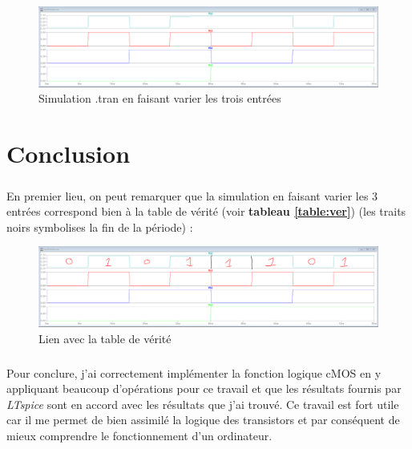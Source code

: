         \begin{figure}[H]
            \centering
            \includegraphics[scale=0.35]{../pictures/tran3.png}
            \caption{Simulation .tran en faisant varier les trois entrées}
        \end{figure}
        
\section{Conclusion}

    \subparagraph{}En premier lieu, on peut remarquer que la simulation en faisant varier les 3 entrées correspond bien à la table de vérité (voir \textbf{tableau \ref{table:ver}}) (les traits noirs symbolises la fin de la période) :
        
        \begin{figure}[H]
            \centering
            \includegraphics[scale=0.35]{../pictures/vérité.png}
            \caption{Lien avec la table de vérité}
        \end{figure}
        
    \subparagraph{}Pour conclure, j'ai correctement implémenter la fonction logique cMOS en y appliquant 
    beaucoup d'opérations pour ce travail et que les résultats fournis par \textit{LTspice} sont en accord avec 
    les résultats que j'ai trouvé. Ce travail est fort utile car il me permet de bien assimilé la logique des 
    transistors et par conséquent de mieux comprendre le fonctionnement d'un ordinateur.


